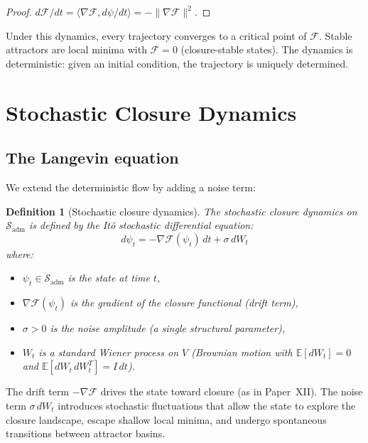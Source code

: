 \documentclass[12pt]{article}
\newtheorem{definition}[theorem]{Definition}
\newcommand{\Fcal}{\mathcal{F}}
\newcommand{\Sadm}{\mathcal{S}_{\mathrm{adm}}}
\begin{document}
\begin{proof}
$d\Fcal/dt = \langle\nabla\Fcal, d\psi/dt\rangle = -\|\nabla\Fcal\|^2$.
\end{proof}

Under this dynamics, every trajectory converges to a critical point of $\Fcal$. Stable attractors are local minima with $\Fcal = 0$ (closure-stable states). The dynamics is deterministic: given an initial condition, the trajectory is uniquely determined.

\section{Stochastic Closure Dynamics}\label{sec:stochastic}

\subsection{The Langevin equation}

We extend the deterministic flow by adding a noise term:

\begin{definition}[Stochastic closure dynamics]\label{def:SCD}
The stochastic closure dynamics on $\Sadm$ is defined by the It\^o stochastic differential equation:
\begin{equation}\label{eq:langevin}
    d\psi_t = -\nabla\Fcal(\psi_t)\, dt + \sigma\, dW_t
\end{equation}
where:
\begin{itemize}
    \item $\psi_t \in \Sadm$ is the state at time $t$,
    \item $\nabla\Fcal(\psi_t)$ is the gradient of the closure functional (drift term),
    \item $\sigma > 0$ is the noise amplitude (a single structural parameter),
    \item $W_t$ is a standard Wiener process on $V$ (Brownian motion with $\mathbb{E}[dW_t] = 0$ and $\mathbb{E}[dW_t\, dW_t^T] = I\, dt$).
\end{itemize}
\end{definition}

The drift term $-\nabla\Fcal$ drives the state toward closure (as in Paper~XII). The noise term $\sigma\, dW_t$ introduces stochastic fluctuations that allow the state to explore the closure landscape, escape shallow local minima, and undergo spontaneous transitions between attractor basins.
\end{document}
